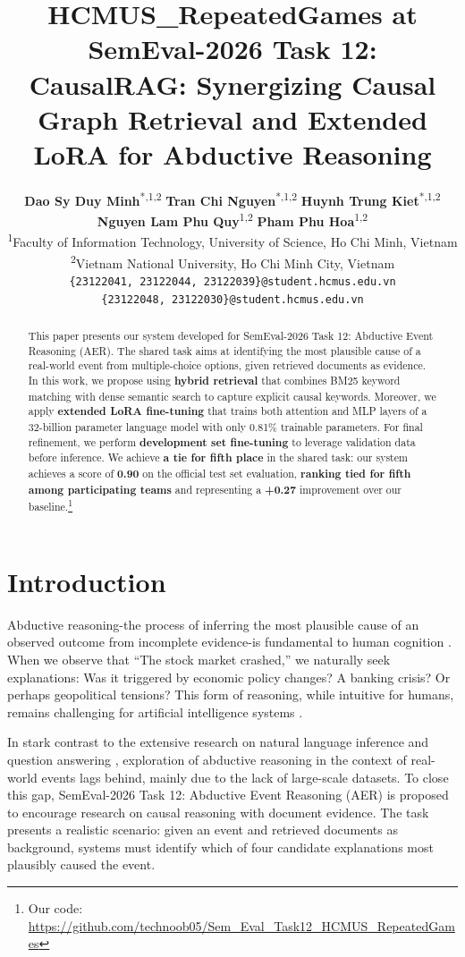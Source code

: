 \documentclass[11pt]{article}
\title{HCMUS\_RepeatedGames at SemEval-2026 Task 12: CausalRAG: Synergizing Causal Graph Retrieval and Extended LoRA for Abductive Reasoning}
\author{
  \textbf{Dao Sy Duy Minh}\textsuperscript{*,1,2} \quad \textbf{Tran Chi Nguyen}\textsuperscript{*,1,2} \quad \textbf{Huynh Trung Kiet}\textsuperscript{*,1,2} \\
  \textbf{Nguyen Lam Phu Quy}\textsuperscript{1,2} \quad \textbf{Pham Phu Hoa}\textsuperscript{1,2} \\
  \textsuperscript{1}Faculty of Information Technology, University of Science, Ho Chi Minh, Vietnam \\
  \textsuperscript{2}Vietnam National University, Ho Chi Minh City, Vietnam \\
  \texttt{\{23122041, 23122044, 23122039\}@student.hcmus.edu.vn} \\
  \texttt{\{23122048, 23122030\}@student.hcmus.edu.vn}
}
\begin{document}
\maketitle
\def\thefootnote{*}\def\thefootnote{\arabic{footnote}}

\begin{abstract}
This paper presents our system developed for SemEval-2026 Task 12: Abductive Event Reasoning (AER). The shared task aims at identifying the most plausible cause of a real-world event from multiple-choice options, given retrieved documents as evidence. In this work, we propose using \textbf{hybrid retrieval} that combines BM25 keyword matching with dense semantic search to capture explicit causal keywords. Moreover, we apply \textbf{extended LoRA fine-tuning} that trains both attention and MLP layers of a 32-billion parameter language model with only 0.81\% trainable parameters. For final refinement, we perform \textbf{development set fine-tuning} to leverage validation data before inference. We achieve \textbf{a tie for fifth place} in the shared task: our system achieves a score of \textbf{0.90} on the official test set evaluation, \textbf{ranking tied for fifth among participating teams} and representing a \textbf{+0.27} improvement over our baseline.\footnote{Our code: \url{https://github.com/technoob05/Sem_Eval_Task12_HCMUS_RepeatedGames}}
\end{abstract}

\section{Introduction}

Abductive reasoning-the process of inferring the most plausible cause of an observed outcome from incomplete evidence-is fundamental to human cognition \cite{peirce1935collected}. When we observe that ``The stock market crashed,'' we naturally seek explanations: Was it triggered by economic policy changes? A banking crisis? Or perhaps geopolitical tensions? This form of reasoning, while intuitive for humans, remains challenging for artificial intelligence systems \cite{bhagavatula2020abductive}.

In stark contrast to the extensive research on natural language inference \cite{devlin2019bert,liu2019roberta} and question answering \cite{rajpurkar2016squad}, exploration of abductive reasoning in the context of real-world events lags behind, mainly due to the lack of large-scale datasets. To close this gap, SemEval-2026 Task 12: Abductive Event Reasoning (AER) is proposed \cite{aer2026task} to encourage research on causal reasoning with document evidence. The task presents a realistic scenario: given an event and retrieved documents as background, systems must identify which of four candidate explanations most plausibly caused the event.
\end{document}
